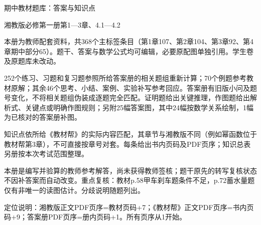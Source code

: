 

\begin{center}{\LARGE 期中教材题库：答案与知识点}\par\medskip
{\large 湘教版必修第一册第1—3章、4.1—4.2}\end{center}
本册为教师配套资料，共368个主标签条目（第1章107、第2章104、第3章92、第4章期中部分65）。题干、答案与数学公式均可编辑，必要原配图单独引用。学生卷及原题库未改动。
\par 252个练习、习题和复习题参照所给答案册的相关题组重新计算；70个例题参考教材原解；其余46个思考、小结、案例、实验补写参考回应。答案册有旧版小问及题号变化，不将相关题组伪装成逐题完全匹配。证明题给出关键推理，作图题给出解析式、关键点或明确作图规则；另附25幅答案图，其中24幅按数学关系绘制，1幅为已核对的答案册补图。
\par 知识点依所给《教材帮》的实际内容匹配，其章节与湘教版不同（例如幂函数位于教材帮第3章），不可直接按章号对套。每条给出书内页码及PDF页序；知识总表另册按本次考试范围整理。
\par 本册是编写并验算的教师参考解答，尚未获得教师签核；题干原先的转写复核状态不因补答案而自动改变。重点复核：教材p.58甲车刹车题条件不足，p.72蓄水量题仅有非唯一的读图估计。分歧说明随题列出。
\par 定位说明：湘教版正文PDF页序=教材页码+7；《教材帮》正文PDF页序=书内页码+9；答案册PDF页序=册内页码+1。所有页序从1开始。
\tableofcontents\clearpage
